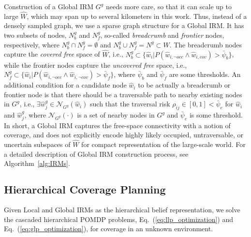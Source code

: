 \documentclass[letterpaper]{article} %
\newcommand{\phdone}[1]{} %
\begin{document}
\phdone{Global IRM}
Construction of a Global IRM $G^g$ needs more care, so that it can scale up to large $\hat{W}$, which may span up to several kilometers in this work.
Thus, instead of a densely sampled graph, we use a sparse graph structure for a Global IRM.
%
It has two subsets of nodes, $N^g_b$ and $N^g_f$, so-called \textit{breadcrumb} and \textit{frontier} nodes, respectively, where $N^g_b \cap N^g_f = \emptyset$ and $N^g_b \cup N^g_f = N^g \! \subset \! \hat{W}$.
%
The breadcrumb nodes capture the \textit{covered free} space of $\hat{W}$, i.e., $N^g_b \subset \{\hat{w}_i | P(\hat{w}_{i,\neg occ} \wedge \hat{w}_{i,cov}) > \bar{\psi}_b\}$, while
the frontier nodes capture the \textit{uncovered free} space, i.e., $N^g_f \subset \{\hat{w}_i | P(\hat{w}_{i,\neg occ} \wedge \hat{w}_{i,\neg cov}) > \bar{\psi}_f\}$,
where $\bar{\psi}_b$ and $\bar{\psi}_f$ are some thresholds.
%
An additional condition for a candidate node $\hat{w}_i$ to be actually a breadcrumb or frontier node is that there should be a traversable path to nearby existing nodes in $G^g$, i.e., $\exists \hat{w}^g_j \in \mathcal{N}_{G^g}(\hat{w}_i)$ such that the traversal risk $\rho_{ij} \in [0, 1] < \bar{\psi}_e$ for $\hat{w}_i$ and $\hat{w}^g_j$, where $\mathcal{N}_{G^g}(\cdot)$ is a set of nearby nodes in $G^g$ and $\bar{\psi}_e$ is some threshold.
%
In short, a Global IRM captures the free-space connectivity with a notion of coverage, and does not explicitly encode highly likely occupied, untraversable, or uncertain subspaces of $\hat{W}$ for compact representation of the large-scale world.
%
For a detailed description of Global IRM construction process, see Algorithm~\ref{alg:IRMs}.




\subsection{Hierarchical Coverage Planning} \label{ssec:belief-planners}

Given Local and Global IRMs as the hierarchical belief representation, we solve the cascaded hierarchical POMDP problems, Eq.~(\ref{eq:llp_optimization}) and Eq.~(\ref{eq:glp_optimization}), for coverage in an unknown environment.
\end{document}
